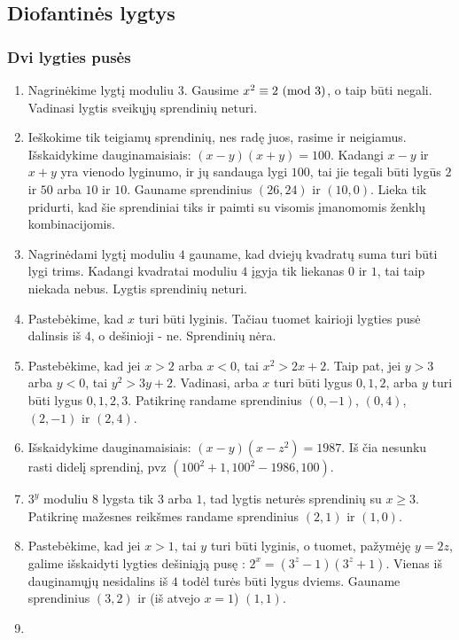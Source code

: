 \subsection*{Diofantinės lygtys}
\subsubsection*{Dvi lygties pusės}
\begin{enumerate}
\item
    Nagrinėkime lygtį moduliu $3$. Gausime $x^2 \equiv 2 \ (\text{mod } 3)$, o taip
    būti negali. Vadinasi lygtis sveikųjų sprendinių neturi.
\item
    Ieškokime tik teigiamų sprendinių, nes radę juos, rasime ir neigiamus.
    Išskaidykime dauginamaisiais: $(x-y)(x+y)=100$. Kadangi $x-y$ ir $x+y$
    yra vienodo lyginumo, ir jų sandauga lygi $100$, tai jie tegali būti
    lygūs $2$ ir $50$ arba $10$ ir $10$. Gauname sprendinius $(26,24)$ ir 
    $(10,0)$. Lieka tik pridurti, kad šie sprendiniai tiks ir paimti su
    visomis įmanomomis ženklų kombinacijomis.
\item
    Nagrinėdami lygtį moduliu $4$ gauname, kad dviejų kvadratų suma turi
    būti lygi trims. Kadangi kvadratai moduliu $4$ įgyja tik liekanas
    $0$ ir $1$, tai taip niekada nebus. Lygtis sprendinių neturi.
\item
    Pastebėkime, kad $x$ turi būti lyginis. Tačiau tuomet kairioji lygties
    pusė dalinsis iš $4$, o dešinioji - ne. Sprendinių nėra.
\item
    Pastebėkime, kad jei $x>2$ arba $x<0$, tai $x^2> 2x + 2$. Taip pat,
    jei $y>3$ arba $y<0$, tai $y^2 > 3y + 2$. Vadinasi, arba $x$ turi būti
    lygus $0, 1, 2$, arba $y$ turi būti lygus $0, 1, 2, 3$. Patikrinę
    randame sprendinius $(0,-1)$, $(0,4)$, $(2, -1)$ ir $(2, 4)$.
\item
    Išskaidykime dauginamaisiais: $(x-y)(x-z^2) = 1987.$ Iš čia nesunku
    rasti didelį sprendinį, pvz $(100^2 + 1,100^2 - 1986, 100)$.	
\item
    $3^y$ moduliu $8$ lygsta tik $3$ arba $1$, tad lygtis neturės
    sprendinių su $x\geq 3$. Patikrinę mažesnes reikšmes randame
    sprendinius $(2,1)$ ir $(1,0)$.
\item
    Pastebėkime, kad jei $x>1$, tai $y$ turi būti lyginis, o tuomet,
    pažymėję $y=2z$, galime išskaidyti lygties dešiniąją pusę : $2^x =
    (3^z - 1)(3^z + 1)$. Vienas iš dauginamųjų nesidalins iš $4$ todėl
    turės būti lygus dviems. Gauname sprendinius $(3,2)$ ir (iš atvejo
    $x=1$) $(1,1)$.
\item

\end{enumerate}
